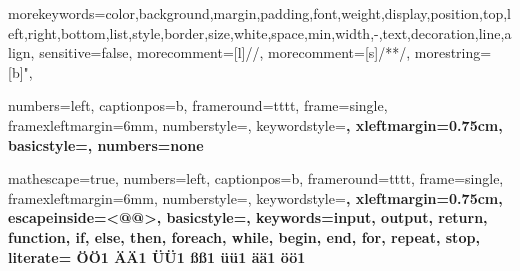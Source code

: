

{morekeywords={color,background,margin,padding,font,weight,display,position,top,left,right,bottom,list,style,border,size,white,space,min,width,-,text,decoration,line,align},
sensitive=false,
morecomment=[l]{//},
morecomment=[s]{/*}{*/},
morestring=[b]",
}

 {
numbers=left,
captionpos=b,
frameround=tttt,
frame=single,
framexleftmargin=6mm,
numberstyle=\tiny,
keywordstyle=\ttfamily\bfseries,
xleftmargin=0.75cm,
basicstyle=\ttfamily,
numbers=none
}

 {
mathescape=true,
numbers=left,
captionpos=b,
frameround=tttt,
frame=single,
framexleftmargin=6mm,
numberstyle=\tiny,
keywordstyle=\ttfamily\bfseries,
xleftmargin=0.75cm,
escapeinside={<@}{@>},
basicstyle=\ttfamily,
keywords={input, output, return, function, if, else, then, foreach, while, begin, end, for, repeat, stop},
literate=%
  {Ö}{{\"O}}1
  {Ä}{{\"A}}1
  {Ü}{{\"U}}1
  {ß}{{\ss}}1
  {ü}{{\"u}}1
  {ä}{{\"a}}1
  {ö}{{\"o}}1
}